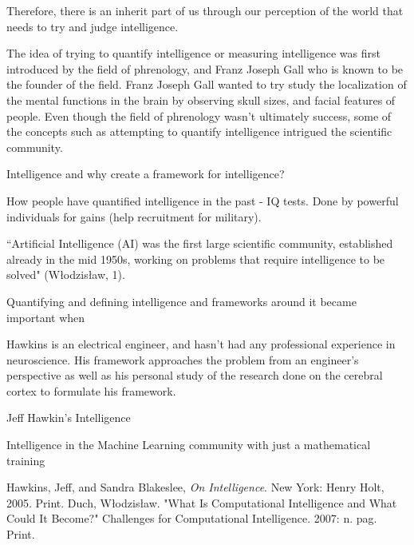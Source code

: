 \documentclass[11pt, oneside]{article}
\begin{document}
Therefore, there is an inherit part of us through our perception of the world that needs to try and judge intelligence.

\par The idea of trying to quantify intelligence or measuring intelligence was first introduced by the field of phrenology, and Franz Joseph Gall who is known to be the founder of the field. Franz Joseph Gall wanted to try study the localization of the mental functions in the brain by observing skull sizes, and facial features of people. Even though the field of phrenology wasn't ultimately success, some of the concepts such as attempting to quantify intelligence intrigued the scientific community.

\par Intelligence and why create a framework for intelligence?


\par How people have quantified intelligence in the past - IQ tests. Done by powerful individuals for gains (help recruitment for military).
\par ``Artificial Intelligence (AI) was the first large scientific community, established already in the mid 1950s, working on problems that require intelligence to be solved" (W\l{}odzis\l{}aw, 1).
\par Quantifying and defining intelligence and frameworks around it became important when



\par Hawkins is an electrical engineer, and hasn't had any professional experience in neuroscience. His framework approaches the problem from an engineer's perspective as well as his personal study of the research done on the cerebral cortex to formulate his framework.
\par Jeff Hawkin's Intelligence

\par Intelligence in the Machine Learning community with just a mathematical training

\begin{thebibliography}{9}
	Hawkins, Jeff, and Sandra Blakeslee,
	\emph{On Intelligence}.
	New York: Henry Holt, 2005.
	Print.
	Duch, W\l{}odzis\l{}aw.
	"What Is Computational Intelligence and What Could It Become?" Challenges for Computational Intelligence.
	2007: n. pag. Print.
\end{thebibliography}
\end{document}
